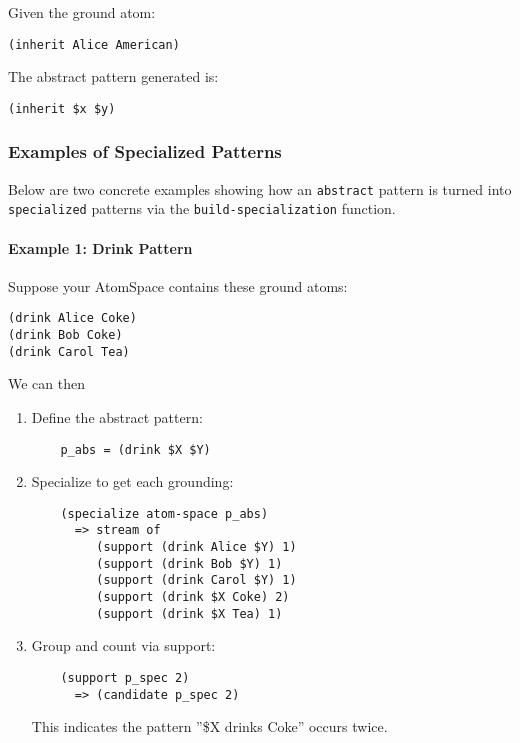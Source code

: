 \documentclass{article}
\begin{document}
Given the ground atom:

\begin{verbatim}
(inherit Alice American)
\end{verbatim}

The abstract pattern generated is:

\begin{verbatim}
(inherit $x $y)
\end{verbatim}


\subsubsection{Examples of Specialized Patterns}

Below are two concrete examples showing how an \texttt{abstract} pattern is turned into \texttt{specialized} patterns via the \texttt{build-specialization} function.

\paragraph{Example 1: Drink Pattern}

Suppose your AtomSpace contains these ground atoms:

\begin{verbatim}
(drink Alice Coke)
(drink Bob Coke)
(drink Carol Tea)
\end{verbatim}

We can then

\begin{enumerate}
\item  Define the abstract pattern:
    \begin{verbatim}
    p_abs = (drink $X $Y)
    \end{verbatim}
\item  Specialize to get each grounding:
    \begin{verbatim}
    (specialize atom-space p_abs)
      => stream of
         (support (drink Alice $Y) 1)
         (support (drink Bob $Y) 1)
         (support (drink Carol $Y) 1)
         (support (drink $X Coke) 2)
         (support (drink $X Tea) 1)
    \end{verbatim}
\item   Group and count via support:
    \begin{verbatim}
    (support p_spec 2)
      => (candidate p_spec 2)
    \end{verbatim}
    This indicates the pattern ''\$X drinks Coke'' occurs twice.
\end{enumerate}
\end{document}
